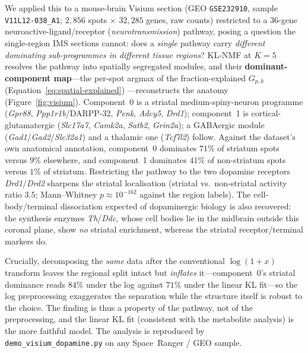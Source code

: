 \documentclass[11pt]{article}
\newcommand{\code}[1]{\texttt{#1}}
\begin{document}
We applied this to a mouse-brain Visium section (GEO \texttt{GSE232910}, sample
\code{V11L12-038\_A1}; $2{,}856$ spots $\times$ $32{,}285$ genes, raw counts) restricted to a
$36$-gene neuroactive-ligand/receptor (\emph{neurotransmission}) pathway, posing a question
the single-region IMS sections cannot: does a \emph{single} pathway carry \emph{different
dominating sub-programmes in different tissue regions}? KL-NMF at $K = 5$ resolves the
pathway into spatially segregated modules, and their \textbf{dominant-component map}---the
per-spot argmax of the fraction-explained $G_{p,k}$ (Equation~\ref{eq:spatial-explained})
---reconstructs the anatomy (Figure~\ref{fig:visium}). Component~0 is a striatal
medium-spiny-neuron programme
(\textit{Gpr88}, \textit{Ppp1r1b}/DARPP-32, \textit{Penk}, \textit{Adcy5}, \textit{Drd1});
component~1 is cortical-glutamatergic (\textit{Slc17a7}, \textit{Camk2a}, \textit{Satb2},
\textit{Grin2a}); a GABAergic module (\textit{Gad1}/\textit{Gad2}/\textit{Slc32a1}) and a
thalamic one (\textit{Tcf7l2}) follow. Against the dataset's own anatomical annotation,
component~0 dominates $71\%$ of striatum spots versus $9\%$ elsewhere, and component~1
dominates $41\%$ of non-striatum spots versus $1\%$ of striatum. Restricting the pathway to
the two dopamine receptors \textit{Drd1}/\textit{Drd2} sharpens the striatal localisation
(striatal vs.\ non-striatal activity ratio $3.5$; Mann--Whitney $p \approx 10^{-162}$ against
the region labels). The cell-body/terminal dissociation expected of dopaminergic biology is
also recovered: the synthesis enzymes \textit{Th}/\textit{Ddc}, whose cell bodies lie in the
midbrain outside this coronal plane, show \emph{no} striatal enrichment, whereas the
striatal receptor/terminal markers do.

Crucially, decomposing the \emph{same} data after the conventional $\log(1+x)$ transform
leaves the regional split intact but \emph{inflates} it---component~0's striatal dominance
reads $84\%$ under the log against $71\%$ under the linear KL fit---so the log preprocessing
exaggerates the separation while the structure itself is robust to the choice. The finding is
thus a property of the pathway, not of the preprocessing, and the linear KL fit (consistent
with the metabolite analysis) is the more faithful model. The analysis is reproduced by
\code{demo\_visium\_dopamine.py} on any Space~Ranger / GEO sample.
\end{document}
